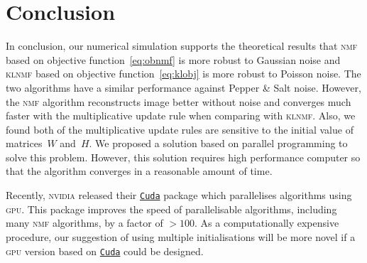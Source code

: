 \section{Conclusion}
In conclusion, our numerical simulation supports the theoretical results that \textsc{nmf} based on objective function~\eqref{eq:obnmf} is more robust to Gaussian noise and \textsc{klnmf} based on objective function~\eqref{eq:klobj} is more robust to Poisson noise. The two algorithms have a similar performance against Pepper \& Salt noise. However, the \textsc{nmf} algorithm reconstructs image better without noise and converges much faster with the multiplicative update rule when comparing with \textsc{klnmf}. Also, we found both of the multiplicative update rules are sensitive to the initial value of matrices~$W$ and~$H$. We proposed a solution based on parallel programming to solve this problem. However, this solution requires high performance computer so that the algorithm converges in a reasonable amount of time.

Recently, \textsc{nvidia} released their \href{https://developer.nvidia.com/cuda-zone}{\texttt{Cuda}} package which parallelises algorithms using \textsc{gpu}. This package improves the speed of parallelisable algorithms, including many \textsc{nmf} algorithms, by a factor of $>100$. As a computationally expensive procedure, our suggestion of using multiple initialisations will be more novel if a \textsc{gpu} version based on \href{https://developer.nvidia.com/cuda-zone}{\texttt{Cuda}} could be designed. 